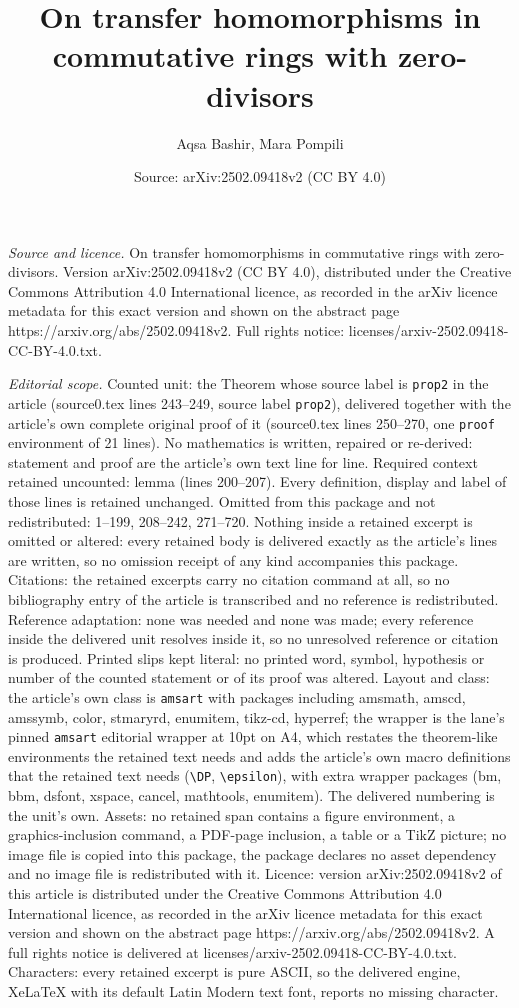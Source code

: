 \documentclass[10pt,a4paper]{amsart}
\title[On transfer homomorphisms in commutative rings with zero-div]{On transfer homomorphisms in commutative rings with zero-divisors}
\author{Aqsa Bashir, Mara Pompili}
\date{Source: arXiv:2502.09418v2 (CC BY 4.0)}
\begin{document}
\maketitle

\noindent\emph{Source and licence.} On transfer homomorphisms in commutative rings with zero-divisors. Version arXiv:2502.09418v2 (CC BY 4.0), distributed under the Creative Commons Attribution 4.0 International licence, as recorded in the arXiv licence metadata for this exact version and shown on the abstract page https://arxiv.org/abs/2502.09418v2. Full rights notice: licenses/arxiv-2502.09418-CC-BY-4.0.txt.\par\smallskip

\noindent\textit{Editorial scope.} Counted unit: the Theorem whose source label is \texttt{prop2} in the article (source0.tex lines 243--249, source label \texttt{prop2}), delivered together with the article's own complete original proof of it (source0.tex lines 250--270, one \texttt{proof} environment of 21 lines). No mathematics is written, repaired or re-derived: statement and proof are the article's own text line for line. Required context retained uncounted: lemma (lines 200--207). Every definition, display and label of those lines is retained unchanged. Omitted from this package and not redistributed: 1--199, 208--242, 271--720. Nothing inside a retained excerpt is omitted or altered: every retained body is delivered exactly as the article's lines are written, so no omission receipt of any kind accompanies this package. Citations: the retained excerpts carry no citation command at all, so no bibliography entry of the article is transcribed and no reference is redistributed. Reference adaptation: none was needed and none was made; every reference inside the delivered unit resolves inside it, so no unresolved reference or citation is produced. Printed slips kept literal: no printed word, symbol, hypothesis or number of the counted statement or of its proof was altered. Layout and class: the article's own class is \texttt{amsart} with packages including amsmath, amscd, amssymb, color, stmaryrd, enumitem, tikz-cd, hyperref; the wrapper is the lane's pinned \texttt{amsart} editorial wrapper at 10pt on A4, which restates the theorem-like environments the retained text needs and adds the article's own macro definitions that the retained text needs (\texttt{\textbackslash DP}, \texttt{\textbackslash epsilon}), with extra wrapper packages (bm, bbm, dsfont, xspace, cancel, mathtools, enumitem). The delivered numbering is the unit's own. Assets: no retained span contains a figure environment, a graphics-inclusion command, a PDF-page inclusion, a table or a TikZ picture; no image file is copied into this package, the package declares no asset dependency and no image file is redistributed with it. Licence: version arXiv:2502.09418v2 of this article is distributed under the Creative Commons Attribution 4.0 International licence, as recorded in the arXiv licence metadata for this exact version and shown on the abstract page https://arxiv.org/abs/2502.09418v2. A full rights notice is delivered at licenses/arxiv-2502.09418-CC-BY-4.0.txt. Characters: every retained excerpt is pure ASCII, so the delivered engine, XeLaTeX with its default Latin Modern text font, reports no missing character.
\end{document}
